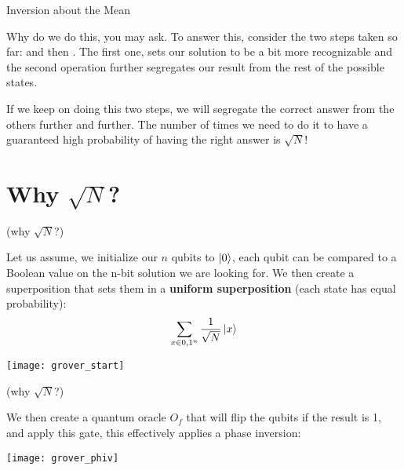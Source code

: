 \documentclass[aspectratio=43]{beamer}
\begin{document}
\begin{frame}{Inversion about the Mean}
    \begin{cardTiny}
        Why do we do this, you may ask. To answer this, consider the two steps taken so far: \phiv and then \iatm. The first one, sets our solution to be a bit more recognizable and the second operation further segregates our result from the rest of the possible states.
    \end{cardTiny}
    \begin{cardTiny}
        If we keep on doing this two steps, we will segregate the correct answer from the others further and further. The number of times we need to do it to have a guaranteed high probability of having the right answer is $\sqrt{N}$!
    \end{cardTiny}
\pagenumber
\end{frame}

\section{Why $\sqrt{N}$?}
\begin{frame}{\gvsa (why $\sqrt{N}$?) }
    \begin{cardTiny}
        Let us assume, we initialize our $n$ qubits to $\ket{0}$, each qubit can be compared to a Boolean value on the n-bit solution we are looking for. We then create a superposition that sets them in a \textbf{uniform superposition} (each state has equal probability):
        \begin{equation*}
            \sum_{x \in {0,1}^n} \frac{1}{\sqrt{N}}\ket{x}
        \end{equation*}
        \begin{center}
            \texttt{[image: grover\_start]}
        \end{center}
    \end{cardTiny}
\pagenumber
\end{frame}


\begin{frame}{\gvsa (why $\sqrt{N}$?)}
    \begin{cardTiny}
        We then create a quantum oracle $O_f$ that will flip the qubits if the result is 1, and apply this gate, this effectively applies a phase inversion:
        \begin{center}
            \texttt{[image: grover\_phiv]}
        \end{center}
    \end{cardTiny}
\pagenumber
\end{frame}
\end{document}

